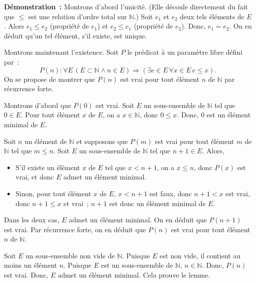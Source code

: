 \medskip

\noindent\textbf{Démonstration :} 
    Montrons d'abord l'unicité. 
    (Elle découle directement du fait que $\leq$ est une relation d'ordre total sur $\mathbb{N}$.)
    Soit $e_1$ et $e_2$ deux tels éléments de $E$. 
    Alors $e_1 \leq e_2$ (propriété de $e_1$) et $e_2 \leq e_1$ (propriété de $e_2$). 
    Donc, $e_1 = e_2$. 
    On en déduit qu'un tel élément, s'il existe, est unique. 

    Montrons maintenant l'existence. 
    Soit $P$ le prédicat à un paramètre libre défini par : 
    \begin{equation}
        P(n): \forall E \, (E \subset \mathbb{N} \wedge n \in E) \Rightarrow (\exists e \in E \, \forall x \in E \, e \leq x).
    \end{equation}
    On se propose de montrer que $P(n)$ est vrai pour tout élément $n$ de $\mathbb{N}$ par récurrence forte. 

    Montrons d'abord que $P(0)$ est vrai. 
    Soit $E$ un sous-ensemble de $\mathbb{N}$ tel que $0 \in E$. 
    Pour tout élément $x$ de $E$, on a $x \in \mathbb{N}$, donc $0 \leq x$. 
    Donc, $0$ est un élément minimal de $E$.

    Soit $n$ un élément de $\mathbb{N}$ et supposons que $P(m)$ est vrai pour tout élément $m$ de $\mathbb{N}$ tel que $m \leq n$. 
    Soit $E$ un sous-ensemble de $\mathbb{N}$ tel que $n+1 \in E$. 
    Alors, 
    \begin{itemize}[nosep]
        \item S'il existe un élément $x$ de $E$ tel que $x < n+1$, on a $x \leq n$, donc $P(x)$ est vrai, et donc $E$ admet un élément minimal.
        \item Sinon, pour tout élément $x$ de $E$, $x < n+1$ est faux, donc $n+1 < x$ est vrai, donc $n+1 \leq x$ et vrai ; $n+1$ est donc un élément minimal de $E$.
    \end{itemize}
    Dans les deux cas, $E$ admet un élément minimal. 
    On en déduit que $P(n+1)$ est vrai. 
    Par récurrence forte, on en déduit que $P(n)$ est vrai pour tout élément $n$ de $\mathbb{N}$. 
    
    Soit $E$ un sous-ensemble non vide de $\mathbb{N}$. 
    Puisque $E$ est non vide, il contient au moins un élément $n$. 
    Puisque $E$ est un sous-ensemble de $\mathbb{N}$, $n \in \mathbb{N}$. 
    Donc, $P(n)$ est vrai. 
    Donc, $E$ admet un élément minimal.
    Cela prouve le lemme. 

   \done 

